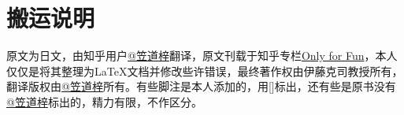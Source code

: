 \section*{搬运说明}

原文为日文，由知乎用户\href{https://www.zhihu.com/people/wo-bei-56}{@笠道梓}翻译，原文刊载于知乎专栏\href{https://www.zhihu.com/column/c_1245739225699885056}{Only for Fun}，本人仅仅是将其整理为\LaTeX 文档并修改些许错误，最终著作权由伊藤克司教授所有，翻译版权由\href{https://www.zhihu.com/people/wo-bei-56}{@笠道梓}所有。有些脚注是本人添加的，用[]标出，还有些是原书没有\href{https://www.zhihu.com/people/wo-bei-56}{@笠道梓}标出的，精力有限，不作区分。
